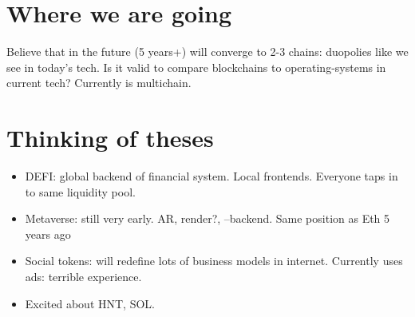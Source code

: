 \documentclass{../notes}
\begin{document}
\section{Where we are going}
Believe that in the future (5 years+) will converge to 2-3 chains: duopolies like we see in today's tech. Is it valid to compare blockchains to operating-systems in current tech? Currently is multichain. 

\section{Thinking of theses}
\begin{itemize}
    \item DEFI: global backend of financial system. Local frontends. Everyone taps in to same liquidity pool. 
    \item Metaverse: still very early. AR, render?, --backend. Same position as Eth 5 years ago 
    \item Social tokens: will redefine lots of business models in internet. Currently uses ads: terrible experience. 
    \item Excited about HNT, SOL. 
\end{itemize}
\end{document}
